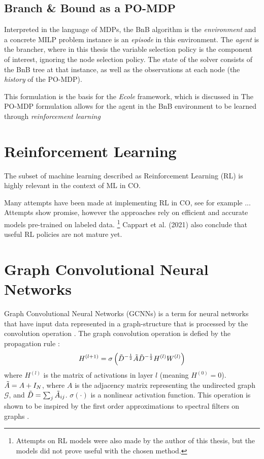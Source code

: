 \subsection{Branch \& Bound as a \gls{PO-MDP}}

Interpreted in the language of \gls{MDP}s, the \gls{BnB} algorithm is the \textit{environment} and a concrete \gls{MILP} problem instance is an \textit{episode} in this environment. The \textit{agent} is the brancher, where in this thesis the variable selection policy is the component of interest, ignoring the node selection policy. The state of the solver consists of the \gls{BnB} tree at that instance, as well as the observations at each node (the \textit{history} of the \gls{PO-MDP}).

This formulation is the basis for the \textit{Ecole} framework, which is discussed in 
The \gls{PO-MDP} formulation allows for the agent in the \gls{BnB} environment to be learned through \textit{reinforcement learning}


\section{Reinforcement Learning}

The subset of machine learning described as Reinforcement Learning (\gls{RL}) is highly relevant in the context of \gls{ML} in \gls{CO}. 

Many attempts have been made at implementing \gls{RL} in \gls{CO}, see for example ... Attempts show promise, however the approaches rely on efficient and accurate models pre-trained on labeled data. 
\footnote{Attempts on \gls{RL} models were also made by the author of this thesis, but the models did not prove useful with the chosen method.}
Cappart et al. (2021) \cite{cappart2021combinatorial} also conclude that useful \gls{RL} policies are not mature yet. 


\section{Graph Convolutional Neural Networks }

Graph Convolutional Neural Networks (\gls{GCNN}s) is a term for neural networks that have input data represented in a graph-structure that is processed by the convolution operation \cite{kipf2016semisupervised}. The graph convolution operation is defied by the propagation rule \cite{kipf2016semisupervised}:
\begin{equation}
    H^{(l+1)} = \sigma \left( \Tilde{D}^{-\frac{1}{2}} \Tilde{A} \Tilde{D}^{-\frac{1}{2}} H^{(l)}W^{(l)}\right)
\end{equation}
where $H^{(l)}$ is the matrix of activations in layer $l$ (meaning $H^{(0)} = 0$). $\Tilde{A} = A + I_N$, where $A$ is the adjacency matrix representing the undirected graph $\mathcal{G}$, and $\Tilde{D} = \sum_j \Tilde{A}_{i j}$. $\sigma( \cdot) $ is a nonlinear activation function.
This operation is shown to be inspired by the first order approximations to spectral filters on graphs \cite{kipf2016semisupervised}.

